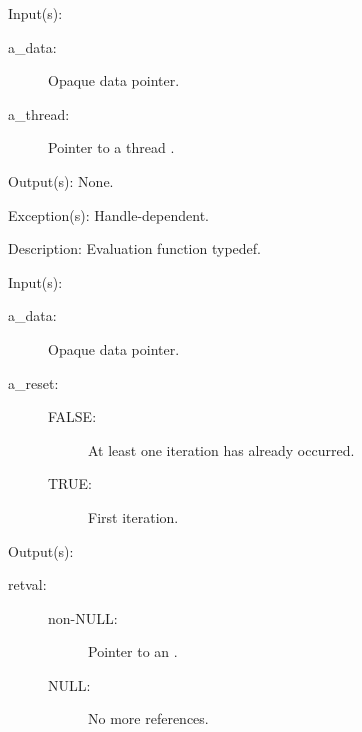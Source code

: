 \begin{capi}
\label{cw_nxo_handle_eval_t}
	\begin{capilist}
	\item[Input(s): ]
		\begin{description}\item[]
		\item[a\_data: ]
			Opaque data pointer.
		\item[a\_thread: ]
			Pointer to a thread .
		\end{description}
	\item[Output(s): ] None.
	\item[Exception(s): ] Handle-dependent.
	\item[Description: ]
		Evaluation function typedef.
	\end{capilist}
\label{cw_nxo_handle_ref_iter_t}
	\begin{capilist}
	\item[Input(s): ]
		\begin{description}\item[]
		\item[a\_data: ]
			Opaque data pointer.
		\item[a\_reset: ]
			\begin{description}\item[]
			\item[FALSE: ]
				At least one iteration has already occurred.
			\item[TRUE: ]
				First iteration.
			\end{description}
		\end{description}
	\item[Output(s): ]
		\begin{description}\item[]
		\item[retval: ]
			\begin{description}\item[]
			\item[non-NULL: ]
				Pointer to an \classname{nxoe}.
			\item[NULL: ]
				No more references.
			\end{description}
		\end{description}

\end{capilist}
\end{capi}
